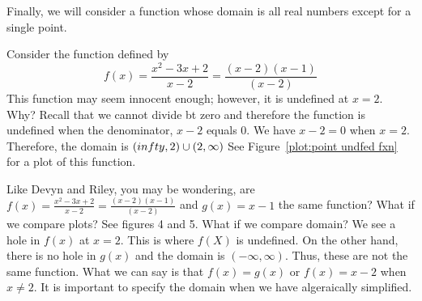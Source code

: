 \documentclass{ximera}
\begin{document}
Finally, we will consider a function whose domain is all real numbers
except for a single point.

\begin{example}
Consider the function defined by 
\[
f(x) = \frac{x^2 - 3x + 2}{x-2} = \frac{(x-2)(x-1)}{(x-2)}
\]
This function may seem innocent enough; however, it is undefined at
$x=2$. Why? Recall that we cannot divide bt zero and therefore the function is undefined when the denominator, $x-2$ equals $0$.  We have $x-2 = 0$ when $x=2$.  Therefore, the domain is $(\-infty ,2)\cup (2,\infty )$  
See Figure~\ref{plot:point undfed fxn} for a plot of this function.
\end{example}

Like Devyn and Riley, you may be wondering, are $f(x) = \frac{x^2 - 3x + 2}{x-2} = \frac{(x-2)(x-1)}{(x-2)}$ and $g(x) = x-1$ the same function?  What if we compare plots?  See figures 4 and 5.  What if we compare domain?  We see a hole in $f(x)$ at $x=2$.  This is where $f(X)$ is undefined.  On the other hand, there is no hole in $g(x)$ and the domain is $(-\infty ,\infty )$.  Thus, these are not the same function.  What we can say is that $f(x)=g(x)$ or $f(x)=x-2$ when $x \ne 2$.  It is important to specify the domain when we have algeraically simplified. 


\begin{image}
\end{image}

\end{document}
